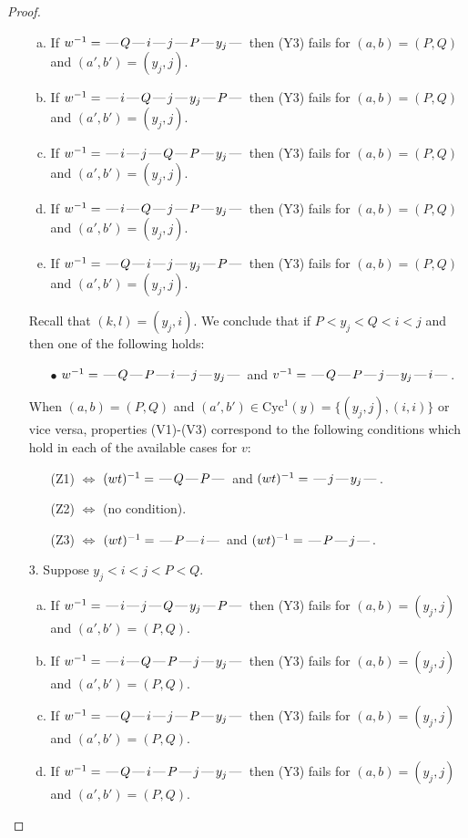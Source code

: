 \documentclass[10pt]{article}
\theoremstyle{definition}
\theoremstyle{definition}
\def\dash{\text{\hspace{0.5mm}---\hspace{0.5mm}}}
\def\Cyc{\mathrm{Cyc}}
\begin{document}
\begin{proof}
\begin{enumerate}
\begin{enumerate}[(a)]
\item If $w^{-1} = \dash Q\dash i\dash j\dash P\dash y_j\dash $ then (Y3) fails for $(a,b)=(P,Q)$ and $(a',b')=(y_j,j)$.
\item If $w^{-1} = \dash i\dash Q\dash j\dash y_j\dash P\dash $ then (Y3) fails for $(a,b)=(P,Q)$ and $(a',b')=(y_j,j)$.
\item If $w^{-1} = \dash i\dash j\dash Q\dash P\dash y_j\dash $ then (Y3) fails for $(a,b)=(P,Q)$ and $(a',b')=(y_j,j)$.
\item If $w^{-1} = \dash i\dash Q\dash j\dash P\dash y_j\dash $ then (Y3) fails for $(a,b)=(P,Q)$ and $(a',b')=(y_j,j)$.
\item If $w^{-1} = \dash Q\dash i\dash j\dash y_j\dash P\dash $ then (Y3) fails for $(a,b)=(P,Q)$ and $(a',b')=(y_j,j)$.
\end{enumerate}
Recall that $(k,l) = (y_j,i)$.
We conclude that if $P < y_j < Q < i < j$ and then one of the following holds:
\begin{enumerate}
\item[$\bullet$] $w^{-1} = \dash Q\dash P\dash i\dash j\dash y_j\dash $ and $v^{-1} = \dash Q\dash P\dash j\dash y_j\dash i\dash $.
\end{enumerate}
When $(a,b)= (P,Q)$ and $(a',b')\in \Cyc^1(y)=\{(y_j,j),(i,i)\}$ or vice versa,
properties (V1)-(V3) correspond to the following conditions which hold in
each of the available cases for $v$:
\begin{enumerate}
\item[](Z1) $\Leftrightarrow$ $(wt)^{-1} = \dash Q \dash P \dash$  and $(wt)^{-1} = \dash j \dash y_j \dash$.
\item[](Z2) $\Leftrightarrow$ (no condition).
\item[](Z3) $\Leftrightarrow$ $(wt)^{-1} = \dash P \dash i \dash$  and $(wt)^{-1} = \dash P \dash j \dash$.
\end{enumerate}
\item[$3$.] Suppose $y_j < i < j < P < Q$.
\begin{enumerate}[(a)]
\item If $w^{-1} = \dash i\dash j\dash Q\dash y_j\dash P\dash $ then (Y3) fails for $(a,b)=(y_j,j)$ and $(a',b')=(P,Q)$.
\item If $w^{-1} = \dash i\dash Q\dash P\dash j\dash y_j\dash $ then (Y3) fails for $(a,b)=(y_j,j)$ and $(a',b')=(P,Q)$.
\item If $w^{-1} = \dash Q\dash i\dash j\dash P\dash y_j\dash $ then (Y3) fails for $(a,b)=(y_j,j)$ and $(a',b')=(P,Q)$.
\item If $w^{-1} = \dash Q\dash i\dash P\dash j\dash y_j\dash $ then (Y3) fails for $(a,b)=(y_j,j)$ and $(a',b')=(P,Q)$.

\end{enumerate}
\end{enumerate}
\end{proof}
\end{document}
